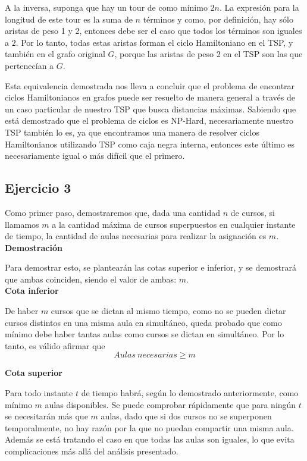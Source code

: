 \documentclass{article}
\begin{document}
A la inversa, suponga que hay un tour de como mínimo $2n$. La expresión para la longitud de este tour es la suma de $n$ términos y como, por definición, hay sólo aristas de peso 1 y 2, entonces debe ser el caso que todos los términos son iguales a $2$. Por lo tanto, todas estas aristas forman el ciclo Hamiltoniano en el TSP, y también en el grafo original $G$, porque las aristas de peso $2$ en el TSP son las que pertenecían a $G$.

Esta equivalencia demostrada nos lleva a concluir que el problema de encontrar ciclos Hamiltonianos en grafos puede ser resuelto de manera general a través de un caso particular de nuestro TSP que busca distancias máximas. Sabiendo que está demostrado que el problema de ciclos es NP-Hard, necesariamente nuestro TSP también lo es, ya que encontramos una manera de resolver ciclos Hamiltonianos utilizando TSP como caja negra interna, entonces este último es necesariamente igual o más difícil que el primero.

\subsection{Ejercicio 3}
Como primer paso, demostraremos que, dada una cantidad $n$ de cursos, si llamamos $m$ a la cantidad máxima de cursos superpuestos en cualquier instante de tiempo, la cantidad de aulas necesarias para realizar la asignación es $m$.\\

\textbf{Demostración}\par
Para demostrar esto, se plantearán las cotas superior e inferior, y se demostrará que ambas coinciden, siendo el valor de ambas: $m$.\\

\textbf{Cota inferior}\par
De haber $m$ cursos que se dictan al mismo tiempo, como no se pueden dictar cursos distintos en una misma aula en simultáneo, queda probado que como mínimo debe haber tantas aulas como cursos se dictan en simultáneo. Por lo tanto, es válido afirmar que $$Aulas\ necesarias \geq m$$\par
\textbf{Cota superior}\par
Para todo instante $t$ de tiempo habrá, según lo demostrado anteriormente, como mínimo $m$ aulas disponibles. Se puede comprobar rápidamente que para ningún $t$ se necesitarán más que $m$ aulas, dado que si dos cursos no se superponen temporalmente, no hay razón por la que no puedan compartir una misma aula. Además se está tratando el caso en que todas las aulas son iguales, lo que evita complicaciones más allá del análisis presentado.
\end{document}
